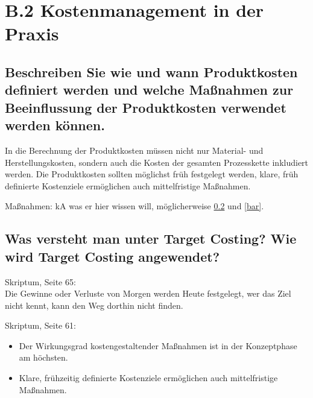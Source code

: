 \section*{B.2 Kostenmanagement in der Praxis}

\subsection{Beschreiben Sie wie und wann Produktkosten definiert werden und welche Ma\ss nahmen zur Beeinflussung der Produktkosten verwendet werden k\"onnen.}
In die Berechnung der Produktkosten m\"ussen nicht nur Material- und Herstellungskosten, sondern auch die Kosten der gesamten Prozesskette inkludiert werden.
Die Produktkosten sollten m\"oglichst fr\"uh festgelegt werden, klare, fr\"uh definierte Kostenziele erm\"oglichen auch mittelfristige Ma\ss nahmen.

Ma\ss nahmen: kA was er hier wissen will, m\"oglicherweise \ref{foo} und \ref{bar}.

\subsection{Was versteht man unter Target Costing? Wie wird Target Costing angewendet?}
\label{foo}
Skriptum, Seite 65:\\
Die Gewinne oder Verluste von Morgen werden Heute festgelegt, wer das Ziel nicht kennt, kann den Weg dorthin nicht finden.

Skriptum, Seite 61:
\begin{itemize}
	\item Der Wirkungsgrad kostengestaltender Ma\ss nahmen ist in der Konzeptphase am h\"ochsten.
	\item Klare, fr\"uhzeitig definierte Kostenziele erm\"oglichen auch mittelfristige Maßnahmen.
\end{itemize}


